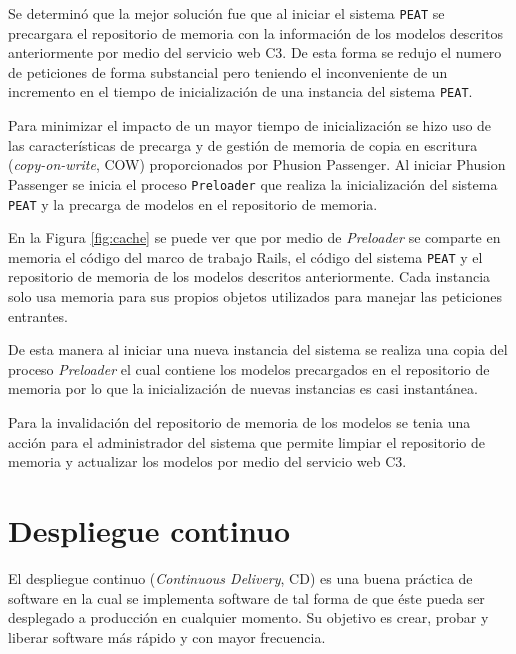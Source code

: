 Se determinó que la mejor solución fue que al iniciar el sistema \texttt{PEAT}
se precargara el repositorio de memoria con la información de los modelos descritos
anteriormente por medio del servicio web C3. De esta forma se redujo el numero de
peticiones de forma substancial pero teniendo el inconveniente de un incremento
en el tiempo de inicialización de una instancia del sistema \texttt{PEAT}.

Para minimizar el impacto de un mayor tiempo de inicialización se hizo uso de las
características de precarga y de gestión de memoria de copia en escritura
(\textit{copy-on-write}, COW) proporcionados por Phusion Passenger. Al iniciar
Phusion Passenger se inicia el proceso \texttt{Preloader} que realiza la
inicialización del sistema \texttt{PEAT} y la precarga de modelos en el
repositorio de memoria.

En la Figura \ref{fig:cache} se puede ver que por medio de \textit{Preloader}
se comparte en memoria el código del marco de trabajo Rails, el código del sistema
\texttt{PEAT} y el repositorio de memoria de los modelos descritos anteriormente.
Cada instancia solo usa memoria para sus propios objetos utilizados para manejar las
peticiones entrantes.

De esta manera al iniciar una nueva instancia del sistema se realiza una copia del
proceso \textit{Preloader} el cual contiene los modelos precargados en el
repositorio de memoria por lo que la inicialización de nuevas instancias es casi
instantánea.


Para la invalidación del repositorio de memoria de los modelos se tenia una acción
para el administrador del sistema que permite limpiar el repositorio de memoria y
actualizar los modelos por medio del servicio web C3.



\section{Despliegue continuo}

El despliegue continuo (\textit{Continuous Delivery}, CD) es una buena práctica de
software en la cual se implementa software de tal forma de que éste pueda ser
desplegado a producción en cualquier momento\cite{27_martin_fowler_cd}. Su objetivo
es crear, probar y liberar software más rápido y con mayor frecuencia.

